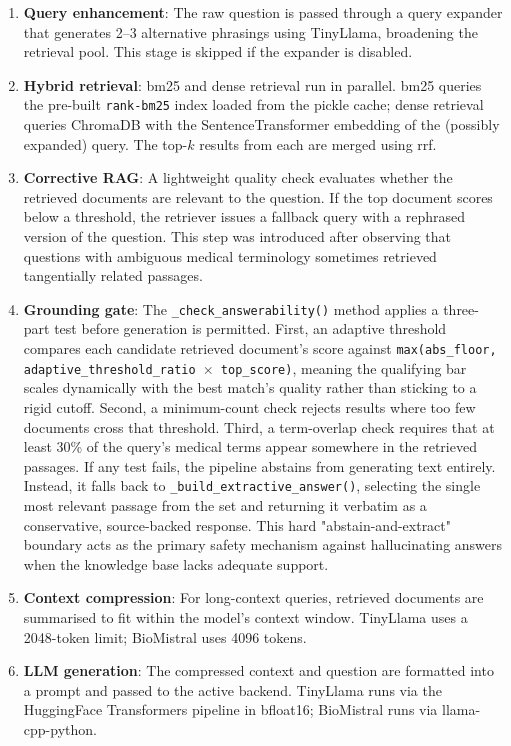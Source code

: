 \begin{enumerate}
    \item \textbf{Query enhancement}: The raw question is passed through a query expander that generates 2--3 alternative phrasings using TinyLlama, broadening the retrieval pool. This stage is skipped if the expander is disabled.
    \item \textbf{Hybrid retrieval}: \ac{bm25} and dense retrieval run in parallel. \ac{bm25} queries the pre-built \texttt{rank-bm25} index loaded from the pickle cache; dense retrieval queries ChromaDB with the SentenceTransformer embedding of the (possibly expanded) query. The top-$k$ results from each are merged using \ac{rrf}.
    \item \textbf{Corrective RAG}: A lightweight quality check evaluates whether the retrieved documents are relevant to the question. If the top document scores below a threshold, the retriever issues a fallback query with a rephrased version of the question. This step was introduced after observing that questions with ambiguous medical terminology sometimes retrieved tangentially related passages.
    \item \textbf{Grounding gate}: The \texttt{\_check\_answerability()} method applies a three-part test before generation is permitted. First, an adaptive threshold compares each candidate retrieved document's score against \texttt{max(abs\_floor,\allowbreak{} adaptive\_threshold\_ratio $\times$ top\_score)}, meaning the qualifying bar scales dynamically with the best match's quality rather than sticking to a rigid cutoff. Second, a minimum-count check rejects results where too few documents cross that threshold. Third, a term-overlap check requires that at least 30\% of the query's medical terms appear somewhere in the retrieved passages. If any test fails, the pipeline abstains from generating text entirely. Instead, it falls back to \texttt{\_build\_extractive\_answer()}, selecting the single most relevant passage from the set and returning it verbatim as a conservative, source-backed response. This hard "abstain-and-extract" boundary acts as the primary safety mechanism against hallucinating answers when the knowledge base lacks adequate support.
    \item \textbf{Context compression}: For long-context queries, retrieved documents are summarised to fit within the model's context window. TinyLlama uses a 2048-token limit; BioMistral uses 4096 tokens.
    \item \textbf{LLM generation}: The compressed context and question are formatted into a prompt and passed to the active backend. TinyLlama runs via the HuggingFace Transformers pipeline in bfloat16; BioMistral runs via llama-cpp-python.

\end{enumerate}
